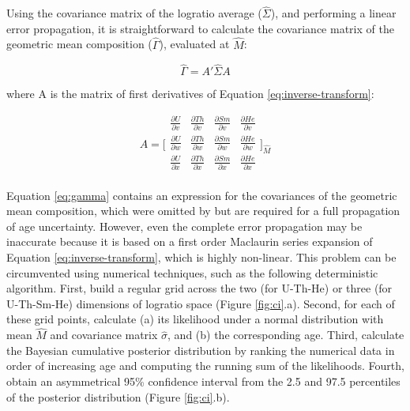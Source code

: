 \documentclass{article}
\begin{document}
Using the covariance matrix of the logratio average ($\hat{\Sigma}$),
and performing a linear error propagation, it is straightforward to
calculate the covariance matrix of the geometric mean composition
($\hat{\Gamma}$), evaluated at $\hat{M}$:

\begin{equation}
\label{eq:gamma}
\hat{\Gamma} = A'\hat{\Sigma} A
\end{equation}

where A is the matrix of first derivatives of Equation \ref{eq:inverse-transform}:

\begin{equation}
\label{eq:df}
A =  \Biggl[
\begin{array}{cccc}
\frac{\partial U}{\partial v} & \frac{\partial Th}{\partial v} & 
\frac{\partial Sm}{\partial v} & \frac{\partial He}{\partial v}\\
\frac{\partial U}{\partial w} & \frac{\partial Th}{\partial w} & 
\frac{\partial Sm}{\partial w} & \frac{\partial He}{\partial w}\\
\frac{\partial U}{\partial x} & \frac{\partial Th}{\partial x} & 
\frac{\partial Sm}{\partial x} & \frac{\partial He}{\partial x}\\
\end{array}
\Biggr]_{\hat{M}}
\end{equation}

Equation \ref{eq:gamma} contains an expression for the covariances of
the geometric mean composition, which were omitted by
\citet{vermeesch2008a} but are required for a full propagation of age
uncertainty. However, even the complete error propagation may be
inaccurate because it is based on a first order Maclaurin series
expansion of Equation \ref{eq:inverse-transform}, which is highly
non-linear.  This problem can be circumvented using numerical
techniques, such as the following deterministic algorithm.  First,
build a regular grid across the two (for U-Th-He) or three (for
U-Th-Sm-He) dimensions of logratio space (Figure \ref{fig:ci}.a).
Second, for each of these grid points, calculate (a) its likelihood
under a normal distribution with mean $\hat{M}$ and covariance matrix
$\hat{\sigma}$, and (b) the corresponding age.  Third, calculate the
Bayesian cumulative posterior distribution by ranking the numerical
data in order of increasing age and computing the running sum of the
likelihoods.  Fourth, obtain an asymmetrical 95\% confidence interval
from the 2.5 and 97.5 percentiles of the posterior distribution
(Figure \ref{fig:ci}.b).
\end{document}

